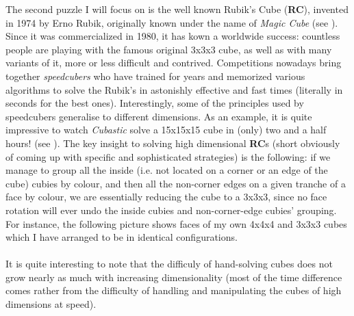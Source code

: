 The second puzzle I will focus on is the well known Rubik's Cube (\textbf{RC}), invented in 1974 by Erno Rubik, originally known under the name of \textit{Magic Cube} (see \cite{RubiksWiki}). Since it was commercialized in 1980, it has kown a worldwide success: countless people are playing with the famous original 3x3x3 cube, as well as with many variants of it, more or less difficult and contrived. Competitions nowadays bring together \textit{speedcubers} who have trained for years and memorized various algorithms to solve the Rubik's in astonishly effective and fast times (literally in seconds for the best ones). Interestingly, some of the principles used by speedcubers generalise to different dimensions. As an example, it is quite impressive to watch \textit{Cubastic} solve a 15x15x15 cube in (only) two and a half hours! (see \cite{151515Rubiks}). The key insight to solving high dimensional \textbf{RC}s (short obviously of coming up with specific and sophisticated strategies) is the following: if we manage to group all the inside (i.e. not located on a corner or an edge of the cube) cubies by colour, and then all the non-corner edges on a given tranche of a face by colour, we are essentially reducing the cube to a 3x3x3, since no face rotation will ever undo the inside cubies and non-corner-edge cubies' grouping. For instance, the following picture shows faces of my own 4x4x4 and 3x3x3 cubes which I have arranged to be in identical configurations.
\\
\\
It is quite interesting to note that the difficuly of hand-solving cubes does not grow nearly as much with increasing dimensionality (most of the time difference comes rather from the difficulty of handling and manipulating the cubes of high dimensions at speed). 


